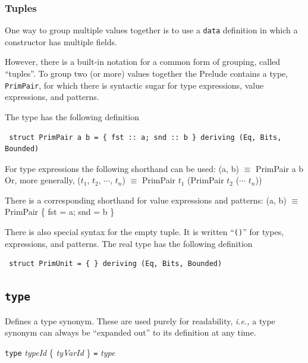 \documentclass[twoside,letterpaper]{article}
\newcommand{\hm}{\hspace*{1em}}
\newcommand{\hmm}{\hspace*{2em}}
\newcommand{\ie}{\emph{i.e.,}}
\newcommand{\te}[1]{\texttt{#1}}
\newcommand{\nterm}[1]{\emph{#1}}
\newcommand{\term}[1]{{\tt{#1}}}
\newcommand{\many}[1]{\{ #1 \}}
\newcommand{\gram}[2]{    \hm\makebox[10em][l]{\it #1}\makebox[1.5em][l]{::=}    #2}
\newcommand{\qbs}[1]{``\mbox{\te{#1}}''}
\begin{document}

\subsubsection{Tuples}

\label{sec-tuple-type}

One way to group multiple values together is to use a {\te{data}}
definition in which a constructor has multiple fields.

However, there is a built-in notation for a common form of grouping,
called ``tuples''.  To group two (or more) values together the Prelude
contains a type,
\te{PrimPair}, for which there is syntactic sugar for type expressions,
value expressions, and patterns.

The type has the following definition
\begin{verbatim}
 struct PrimPair a b = { fst :: a; snd :: b } deriving (Eq, Bits, Bounded)
\end{verbatim}
For type expressions the following shorthand can be used:
\BBS
(a, b)  \hmm  $\equiv$  \hmm  PrimPair a b
\EBS
Or, more generally,
\BBS
($t_1$, $t_2$, $\cdots$, $t_n$)  \hmm  $\equiv$  \hmm  PrimPair $t_1$ (PrimPair $t_2$ ($\cdots$ $t_n$))
\EBS

There is a corresponding shorthand for value expressions and patterns:
\BBS
(a, b)  \hmm  $\equiv$  \hmm  PrimPair \{ fst = a; snd = b \}
\EBS

There is also special syntax for the empty tuple.  It is written \qbs{()} for
types, expressions, and patterns.  The real type has the following definition
\begin{verbatim}
 struct PrimUnit = { } deriving (Eq, Bits, Bounded)
\end{verbatim}


\subsection{\te{type}}

Defines a type synonym.  These are used purely for readability, {\ie}
a type synonym can always be ``expanded out'' to its definition at any
time.

\gram{topDefn}{ \term{type} \nterm{typeId} \many{\nterm{tyVarId}} \term{=} \nterm{type} }
\end{document}
